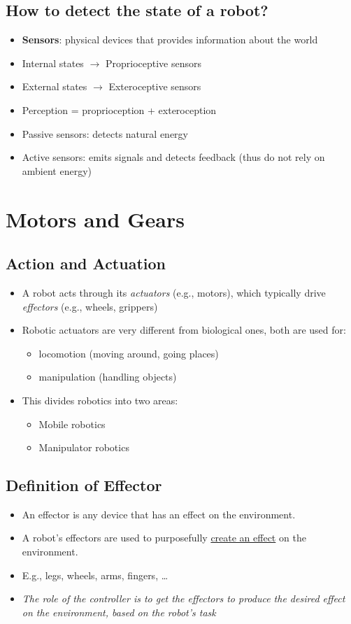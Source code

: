 \documentclass[10pt]{article}
\begin{document}
\subsection*{How to detect the state of a robot?}
\begin{itemize}
	\item \textbf{Sensors}: physical devices that provides information about the world
	\item Internal states $\rightarrow$ Proprioceptive sensors
	\item External states $\rightarrow$ Exteroceptive sensors
	\item Perception = proprioception + exteroception
	\item Passive sensors: detects natural energy
	\item Active sensors: emits signals and detects feedback (thus do not rely on ambient energy)
\end{itemize}

\section*{Motors and Gears}
\subsection*{Action and Actuation}
\begin{itemize}
	\item A robot acts through its \textit{actuators} (e.g., motors), which typically drive \textit{effectors} (e.g., wheels, grippers)
	\item Robotic actuators are very different from biological ones, both are used for:
	\begin{itemize}
        \item locomotion (moving around, going places)
        \item manipulation (handling objects)
    \end{itemize}
    \item This divides robotics into two areas:
    \begin{itemize}
        \item Mobile robotics
        \item Manipulator robotics
    \end{itemize}
\end{itemize}

\subsection*{Definition of Effector}
\begin{itemize}
	\item An effector is any device that has an effect on the environment.
	\item A robot's effectors are used to purposefully \underline{create an effect} on the environment.
	\item E.g., legs, wheels, arms, fingers, \dots
	\item \textit{The role of the controller is to get the effectors to produce the desired effect on the environment, based on the robot's task}
\end{itemize}
\end{document}
